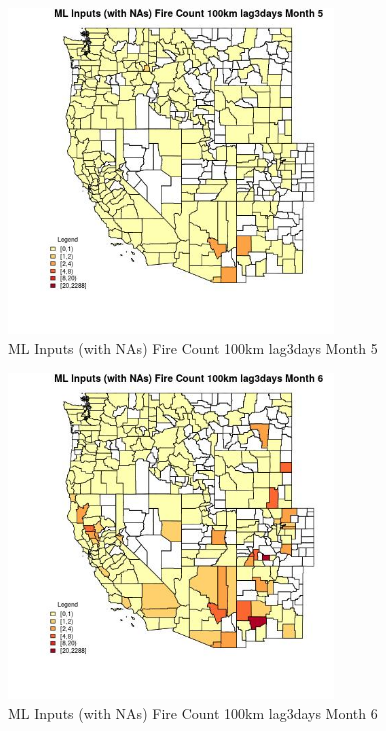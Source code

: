 \begin{figure} 
\centering  
\includegraphics[width=0.77\textwidth]{Code_Outputs/Report_ML_input_PM25_Step4_part_e_de_duplicated_aves_compiled_2019-05-20wNAs_CountyFire_Count_100km_lag3daysmedianMonth5.jpg} 
\caption{\label{fig:Report_ML_input_PM25_Step4_part_e_de_duplicated_aves_compiled_2019-05-20wNAsCountyFire_Count_100km_lag3daysmedianMonth5}ML Inputs (with NAs) Fire Count 100km lag3days Month 5} 
\end{figure} 
 

\begin{figure} 
\centering  
\includegraphics[width=0.77\textwidth]{Code_Outputs/Report_ML_input_PM25_Step4_part_e_de_duplicated_aves_compiled_2019-05-20wNAs_CountyFire_Count_100km_lag3daysmedianMonth6.jpg} 
\caption{\label{fig:Report_ML_input_PM25_Step4_part_e_de_duplicated_aves_compiled_2019-05-20wNAsCountyFire_Count_100km_lag3daysmedianMonth6}ML Inputs (with NAs) Fire Count 100km lag3days Month 6} 
\end{figure} 
 

